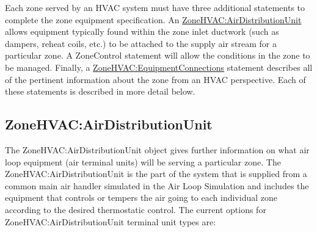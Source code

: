 Each zone served by an HVAC system must have three additional statements to complete the zone equipment specification. An \hyperref[zonehvacairdistributionunit]{ZoneHVAC:AirDistributionUnit} allows equipment typically found within the zone inlet ductwork (such as dampers, reheat coils, etc.) to be attached to the supply air stream for a particular zone. A ZoneControl statement will allow the conditions in the zone to be managed. Finally, a \hyperref[zonehvacequipmentconnections]{ZoneHVAC:EquipmentConnections} statement describes all of the pertinent information about the zone from an HVAC perspective. Each of these statements is described in more detail below.

\subsection{ZoneHVAC:AirDistributionUnit}\label{zonehvacairdistributionunit}

The ZoneHVAC:AirDistributionUnit object gives further information on what air loop equipment (air terminal units) will be serving a particular zone. The ZoneHVAC:AirDistributionUnit is the part of the system that is supplied from a common main air handler simulated in the Air Loop Simulation and includes the equipment that controls or tempers the air going to each individual zone according to the desired thermostatic control. The current options for ZoneHVAC:AirDistributionUnit terminal unit types are:

